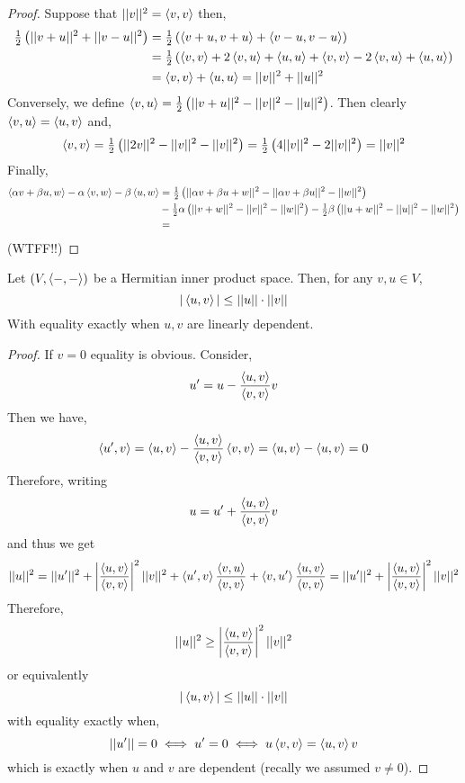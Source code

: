 \documentclass[12pt]{article}
\begin{document}
\begin{proof}
Suppose that $|| v ||^2 = \left< v , v \right>$ then,
\begin{align*}
\tfrac{1}{2} \left( || v + u ||^2 + || v - u ||^2 \right) & = \tfrac{1}{2} \left( \left< v +  u , v + u \right> + \left< v - u , v - u \right> \right) 
\\
& = \tfrac{1}{2} \left( \left< v , v \right> + 2 \left< v , u \right> + \left< u , u \right> + \left< v , v \right> - 2 \left< v , u \right> + \left< u , u \right> \right) 
\\
& = \left< v , v \right> + \left< u , u \right> = || v ||^2 + || u ||^2 
\end{align*}
Conversely, we define $\left< v , u \right> = \tfrac{1}{2} \left( || v + u ||^2 - || v ||^2 - || u ||^2 \right)$. Then clearly $\left< v , u \right> = \left< u , v \right>$ and,
\[ \left< v , v \right> =  \tfrac{1}{2} \left( || 2 v ||^2 - || v ||^2 - || v ||^2 \right) = \tfrac{1}{2} \left( 4 || v ||^2 - 2 || v ||^2 \right) = || v ||^2 \]
Finally, 
\begin{align*}
\left< \alpha v + \beta u , w \right> - \alpha \left< v , w \right> - \beta \left< u , w \right>  & = \tfrac{1}{2} \left( || \alpha v + \beta u + w ||^2 - || \alpha v + \beta u ||^2 - || w ||^2 \right)
\\
& - \tfrac{1}{2} \alpha \left( || v + w ||^2 - || v ||^2 - || w ||^2 \right) - \tfrac{1}{2} \beta \left( ||u + w||^2 - || u ||^2 - || w ||^2 \right)
\\
& = 
\end{align*}
(WTFF!!)
\end{proof}

\begin{prop}
Let $(V, \left< - , - \right>)$ be a Hermitian inner product space. Then, for any $v, u \in V$,
\[ | \left< u , v \right> | \le || u || \cdot || v || \]
With equality exactly when $u, v$ are linearly dependent.
\end{prop}

\begin{proof}
If $v = 0$ equality is obvious. Consider,
\[ u' = u - \frac{\left< u , v \right>}{\left< v , v \right>} v \]
Then we have,
\[ \left< u' , v \right> = \left< u , v \right> - \frac{\left< u , v \right>}{\left< v , v \right>} \left< v , v \right> = \left< u , v \right> - \left< u , v \right> = 0 \]
Therefore, writing 
\[ u = u' + \frac{\left< u , v \right>}{\left< v , v \right>} v \]
and thus we get
\[ ||u||^2 = || u' ||^2 + \left| \frac{\left< u , v \right>}{\left< v , v \right>} \right|^2 || v ||^2 + \left< u' , v \right> \frac{\left< v , u \right>}{\left< v , v \right>} + \left< v , u' \right> \frac{\left< u , v \right>}{\left< v , v \right>} = || u' ||^2 + \left| \frac{\left< u , v \right>}{\left< v , v \right>} \right|^2 || v ||^2 \]
Therefore, 
\[ || u ||^2 \ge \left| \frac{\left< u , v \right>}{\left< v , v \right>} \right|^2 || v ||^2 \]
or equivalently
\[ | \left< u , v \right> | \le || u || \cdot || v || \]
with equality exactly when,
\[ || u' || = 0 \iff u' = 0 \iff u \left< v , v \right> = \left< u , v \right> v \]
which is exactly when $u$ and $v$ are dependent (recally we assumed $v \neq 0$).
\end{proof}
\end{document}
